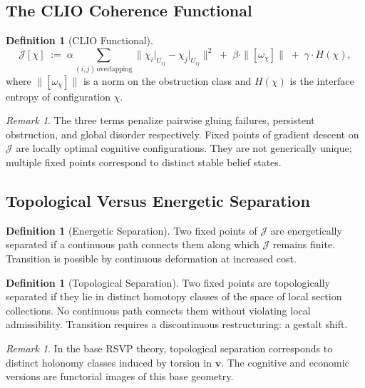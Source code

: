 \documentclass[11pt]{article}
\theoremstyle{plain}
\theoremstyle{definition}
\newtheorem{definition}[theorem]{Definition}
\theoremstyle{remark}
\newtheorem{remark}[theorem]{Remark}
\newcommand{\vv}{\mathbf{v}}
\begin{document}
\subsection{The CLIO Coherence Functional}

\begin{definition}[CLIO Functional]
\[
  \mathcal{J}[\chi] \;:=\;
  \alpha \sum_{(i,j)\,\mathrm{overlapping}}
    \bigl\|\chi_i\big|_{U_{ij}} - \chi_j\big|_{U_{ij}}\bigr\|^2
  \;+\; \beta \cdot \|[\omega_\chi]\|
  \;+\; \gamma \cdot H(\chi),
\]
where $\|[\omega_\chi]\|$ is a norm on the obstruction class and $H(\chi)$
is the interface entropy of configuration $\chi$.
\end{definition}

\begin{remark}
The three terms penalize pairwise gluing failures, persistent obstruction,
and global disorder respectively. Fixed points of gradient descent on
$\mathcal{J}$ are locally optimal cognitive configurations. They are
not generically unique; multiple fixed points correspond to distinct
stable belief states.
\end{remark}

\subsection{Topological Versus Energetic Separation}

\begin{definition}[Energetic Separation]
Two fixed points of $\mathcal{J}$ are energetically separated if a
continuous path connects them along which $\mathcal{J}$ remains finite.
Transition is possible by continuous deformation at increased cost.
\end{definition}

\begin{definition}[Topological Separation]
Two fixed points are topologically separated if they lie in distinct
homotopy classes of the space of local section collections. No continuous
path connects them without violating local admissibility. Transition
requires a discontinuous restructuring: a gestalt shift.
\end{definition}

\begin{remark}
In the base RSVP theory, topological separation corresponds to distinct
holonomy classes induced by torsion in $\vv$. The cognitive and economic
versions are functorial images of this base geometry.
\end{remark}
\end{document}
